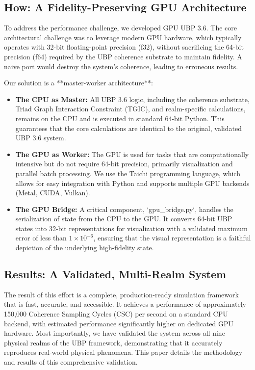 \documentclass[12pt, a4paper]{article}
\begin{document}
\subsection{How: A Fidelity-Preserving GPU Architecture}
To address the performance challenge, we developed GPU UBP 3.6. The core architectural challenge was to leverage modern GPU hardware, which typically operates with 32-bit floating-point precision (f32), without sacrificing the 64-bit precision (f64) required by the UBP coherence substrate to maintain fidelity. A naive port would destroy the system's coherence, leading to erroneous results.

Our solution is a **master-worker architecture**:
\begin{itemize}
    \item \textbf{The CPU as Master:} All UBP 3.6 logic, including the coherence substrate, Triad Graph Interaction Constraint (TGIC), and realm-specific calculations, remains on the CPU and is executed in standard 64-bit Python. This guarantees that the core calculations are identical to the original, validated UBP 3.6 system.
    \item \textbf{The GPU as Worker:} The GPU is used for tasks that are computationally intensive but do not require 64-bit precision, primarily visualization and parallel batch processing. We use the Taichi programming language, which allows for easy integration with Python and supports multiple GPU backends (Metal, CUDA, Vulkan).
    \item \textbf{The GPU Bridge:} A critical component, `gpu\_bridge.py`, handles the serialization of state from the CPU to the GPU. It converts 64-bit UBP states into 32-bit representations for visualization with a validated maximum error of less than $1 \times 10^{-6}$, ensuring that the visual representation is a faithful depiction of the underlying high-fidelity state.
\end{itemize}

\subsection{Results: A Validated, Multi-Realm System}
The result of this effort is a complete, production-ready simulation framework that is fast, accurate, and accessible. It achieves a performance of approximately 150,000 Coherence Sampling Cycles (CSC) per second on a standard CPU backend, with estimated performance significantly higher on dedicated GPU hardware. Most importantly, we have validated the system across all nine physical realms of the UBP framework, demonstrating that it accurately reproduces real-world physical phenomena. This paper details the methodology and results of this comprehensive validation.
\end{document}
